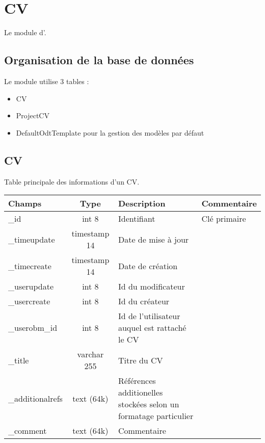 

\clearpage
\section{CV}

Le module \cv d'\obm.

\subsection{Organisation de la base de données}

Le module \cv utilise 3 tables :
\begin{itemize}
 \item CV
 \item ProjectCV
 \item DefaultOdtTemplate pour la gestion des modèles par défaut
\end{itemize}

\subsection{CV}
Table principale des informations d'un CV.\\

\begin{tabular}{|p{3cm}|c|p{5.4cm}|p{2.6cm}|}
\hline
\textbf{Champs} & \textbf{Type} & \textbf{Description} & \textbf{Commentaire} \\
\hline
\_id & int 8 & Identifiant & Clé primaire \\
\hline
\_timeupdate & timestamp 14 & Date de mise à jour & \\
\hline
\_timecreate & timestamp 14 & Date de création & \\
\hline
\_userupdate & int 8 & Id du modificateur & \\
\hline
\_usercreate & int 8 & Id du créateur & \\
\hline
\_userobm\_id & int 8 & Id de l'utilisateur auquel est rattaché le CV & \\
\hline
\_title & varchar 255 & Titre du CV & \\
\hline
\_additionalrefs & text (64k) & Références additionelles stockées selon un formatage particulier &\\
\hline
\_comment & text (64k) & Commentaire &\\
\hline
\end{tabular}

